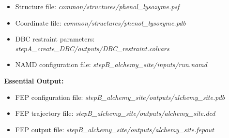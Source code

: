 \documentclass[9pt,tutorial]{Styling/livecoms}
\newcommand{\filepath}[1]{\textit{#1}}
\begin{document}
    \begin{itemize}
        \item Structure file: \filepath{common/structures/phenol\_lysozyme.psf} 
        \item Coordinate file: \filepath{common/structures/phenol\_lysozyme.pdb}
        \item DBC restraint parameters: \filepath{stepA\_create\_DBC/outputs/DBC\_restraint.colvars}
        \item NAMD configuration file: \filepath{stepB\_alchemy\_site/inputs/run.namd}
    \end{itemize}
    \textbf{Essential Output:}
    \begin{itemize}
        \item FEP configuration file: \filepath{stepB\_alchemy\_site/outputs/alchemy\_site.pdb}
        \item FEP trajectory file: \filepath{stepB\_alchemy\_site/outputs/alchemy\_site.dcd}
        \item FEP output file: \filepath{stepB\_alchemy\_site/outputs/alchemy\_site.fepout}
    \end{itemize}
    
\end{document}
